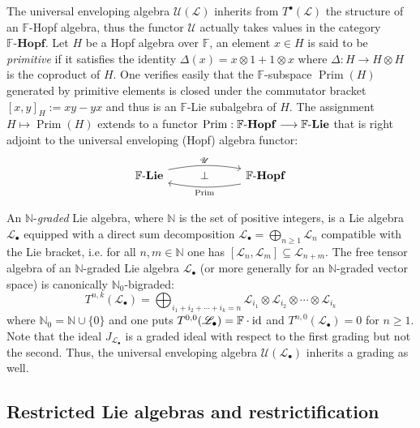 \documentclass{amsart}
\theoremstyle{plain}
\theoremstyle{definition}
\numberwithin{theorem}{section}
\numberwithin{equation}{section}
\newcommand{\LL}{\mathscr{L}}
\newcommand{\Univ}{\mathscr{U}}
\newcommand{\Prim}{\operatorname{Prim}}
\newcommand{\catlie}{\mathbf{Lie}}
\newcommand{\catHopf}{\mathbf{Hopf}}
\newcommand{\FF}{\mathbb{F}}
\begin{document}
The universal enveloping algebra $\Univ(\LL)$ inherits from $T^\bullet(\LL)$ the structure of an $\FF$-Hopf algebra, thus the functor $\Univ$ actually takes values in the category $\FF\text{-}\catHopf$. 
Let $H$ be a Hopf algebra over $\FF$, an element $x \in H$ is said to be \emph{primitive} if it satisfies the identity $\Delta(x) = x \otimes 1 + 1 \otimes x$ where $\Delta : H \to H \otimes H$ is the coproduct of $H$. One verifies easily that the $\FF$-subspace $\Prim(H)$ generated by primitive elements is closed under the commutator bracket $[x, y]_H := xy - yx$ and thus is an $\FF$-Lie subalgebra of $H$. The assignment $H \mapsto \Prim(H)$ extends to a functor $\Prim : \FF\text-\catHopf \longrightarrow \FF\text-\catlie$ that is right adjoint to the universal enveloping (Hopf) algebra functor:
\begin{equation}\begin{tikzcd}\label{eq:adj.hopf}
    \FF\text{-}\catlie \arrow[rr, yshift=3pt, bend left=10pt, "\Univ"] & {\bot} & \FF\text{-}\catHopf \arrow[ll, yshift=-3pt, bend left=10pt, "\Prim" below] \mathclap{\quad \quad \quad}
\end{tikzcd}\end{equation}

An $\mathbb N$-\emph{graded} Lie algebra, where $\mathbb N$ is the set of positive integers, is a Lie algebra $\LL_\bullet$ equipped with a direct sum decomposition $\LL_\bullet = \bigoplus_{n \geq 1} \LL_n$ compatible with the Lie bracket, i.e. for all $n, m \in \mathbb N$ one has $[\LL_n, \LL_m] \subseteq \LL_{n+m}$.
\noindent
The free tensor algebra of an $\mathbb N$-graded Lie algebra $\LL_\bullet$ (or more generally for an $\mathbb N$-graded vector space) is canonically $\mathbb N_0$-bigraded:
\begin{equation}
	T^{n, k}(\LL_\bullet) = \bigoplus_{i_1 + i_2 + \cdots + i_k = n} \LL_{i_1} \otimes \LL_{i_2} \otimes \cdots \otimes \LL_{i_k}
\end{equation}
where $\mathbb N_0 = \mathbb N\cup \{0\}$ and one puts $T^{0, 0}(\LL_\bullet) = \FF \cdot {\rm id}$ and $T^{n, 0}(\LL_\bullet) = 0$ for $n \geq 1$. Note that the ideal $J_{\LL_\bullet}$ is a graded ideal with respect to the first grading but not the second. Thus, the universal enveloping algebra $\Univ(\LL_\bullet)$ inherits a grading as well.

\subsection{Restricted Lie algebras and restrictification}
\end{document}
